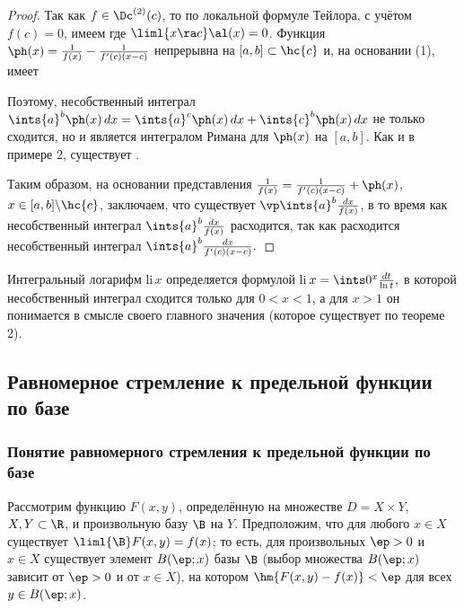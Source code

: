 \documentclass[a4paper]{article}
\begin{document}
\begin{proof}
Так как $f\in\Dc^{(2)}(c)$, то по локальной формуле Тейлора, с
учётом $f(c)=0$, имеем  где $\liml{x\ra c} \al(x)=0$.
Функция $\ph(x) = \frac1{f(x)} - \frac1{f'(c)(x-c)}$ непрерывна на
$[a,b]\subset\hc{c}$ и, на основании (1), имеет 

Поэтому, несобственный интеграл $\ints{a}^b \ph(x)\,dx = \ints{a}^c
\ph(x)\,dx + \ints{c}^b \ph(x)\,dx$ не только сходится, но и
является интегралом Римана для $\ph(x)$ на $[a,b]$. Как и в примере
2, существует .

Таким образом, на основании представления $\frac1{f(x)} =
\frac1{f'(c)(x-c)}+\ph(x)$, $x\in[a,b]\backslash\hc{c}$, заключаем,
что существует $\vp\ints{a}^b \frac{dx}{f(x)}$, в то время как
несобственный интеграл $\ints{a}^b \frac{dx}{f(x)}$ расходится, так
как расходится несобственный интеграл $\ints{a}^b
\frac{dx}{f'(c)(x-c)}.$
\end{proof}

\begin{ex}
Интегральный логарифм li\,$x$ определяется формулой li\,$x =
\ints0^x \frac{dt}{\ln t},$ в которой несобственный интеграл
сходится только для $0<x<1$, а для $x>1$ он понимается в смысле
своего главного значения (которое существует по теореме 2).
\end{ex}

\subsection{Равномерное стремление к предельной функции по базе}
\subsubsection{Понятие равномерного стремления к предельной функции
по базе}

Рассмотрим функцию $F(x,y)$, определённую на множестве $D = X\times
Y$, $X,Y\subset\R$, и произвольную базу $\B$ на $Y$. Предположим,
что для любого $x\in X$ существует $\liml{\B} F(x,y)=f(x)$; то есть,
для произвольных $\ep>0$ и $x\in X$ существует элемент $B(\ep;x)$
базы $\B$ (выбор множества $B(\ep;x)$ зависит от $\ep>0$ и от $x\in
X$), на котором $\hm{F(x,y)-f(x)}<\ep$ для всех $y\in B(\ep;x)$.
\end{document}
